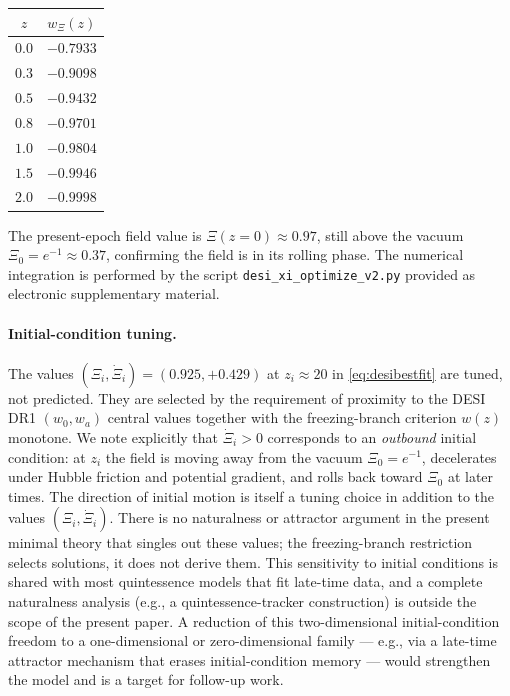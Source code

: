 \documentclass[11pt,reqno]{amsart}
\theoremstyle{plain}
\theoremstyle{definition}
\theoremstyle{remark}
\begin{document}
\begin{center}
\begin{tabular}{c|c}
$z$ & $w_\Xi(z)$\\
\hline
$0.0$ & $-0.7933$\\
$0.3$ & $-0.9098$\\
$0.5$ & $-0.9432$\\
$0.8$ & $-0.9701$\\
$1.0$ & $-0.9804$\\
$1.5$ & $-0.9946$\\
$2.0$ & $-0.9998$
\end{tabular}
\end{center}

The present-epoch field value is $\Xi(z=0) \approx 0.97$, still above
the vacuum $\Xi_0 = e^{-1} \approx 0.37$, confirming the field is in
its rolling phase. The numerical integration is performed by the
script \texttt{desi\_xi\_optimize\_v2.py} provided as electronic
supplementary material.

\paragraph{Initial-condition tuning.}
The values $(\Xi_i, \dot\Xi_i) = (0.925, +0.429)$ at $z_i \approx 20$ in
\eqref{eq:desibestfit} are tuned, not predicted. They are selected by
the requirement of proximity to the DESI DR1 $(w_0, w_a)$ central values
together with the freezing-branch criterion $w(z)$ monotone. We note
explicitly that $\dot\Xi_i > 0$ corresponds to an \emph{outbound}
initial condition: at $z_i$ the field is moving away from the
vacuum $\Xi_0 = e^{-1}$, decelerates under Hubble friction and
potential gradient, and rolls back toward $\Xi_0$ at later times. The
direction of initial motion is itself a tuning choice in addition to
the values $(\Xi_i, \dot\Xi_i)$. There is
no naturalness or attractor argument in the present minimal theory
that singles out these values; the freezing-branch restriction selects
solutions, it does not derive them. This sensitivity to initial
conditions is shared with most quintessence models that fit
late-time data, and a complete naturalness analysis (e.g., a
quintessence-tracker construction) is outside the scope of the present
paper. A reduction of this two-dimensional initial-condition freedom
to a one-dimensional or zero-dimensional family --- e.g., via a
late-time attractor mechanism that erases initial-condition memory ---
would strengthen the model and is a target for follow-up work.
\end{document}
